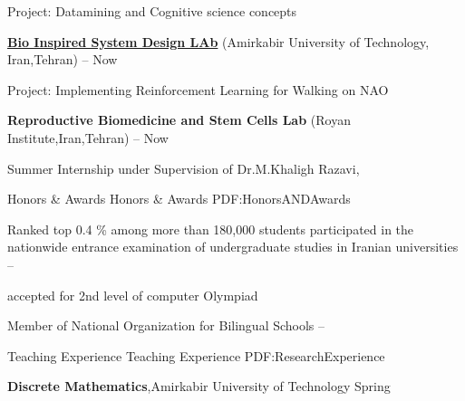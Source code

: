 \documentclass[letterpaper,MMMyyyy,nonstopmode]{simpleresumecv}
\begin{document}
\begin{Body}
\begin{Detail}
\SubBulletItem
Project: Datamining and Cognitive science concepts

\end{Detail}
\href{}
{\textbf{Bio Inspired System Design LAb}} 
\newline (Amirkabir University of Technology,
Iran,Tehran)
\hfill
{} --
Now

\begin{Detail}
\SubBulletItem
Project: Implementing Reinforcement Learning for Walking on NAO
\end{Detail}

{\textbf{Reproductive Biomedicine and Stem Cells Lab}} 
\newline (Royan Institute,Iran,Tehran)
\hfill
{} --
Now
\begin{Detail}
\SubBulletItem
Summer Internship under Supervision of Dr.M.Khaligh Razavi,
\end{Detail}






\Gap




\Section
{Honors \&\newline
Awards}
{Honors \& Awards}
{PDF:HonorsANDAwards}

\BulletItem
Ranked top 0.4 \% among more than 180,000 students participated
in the nationwide entrance examination of undergraduate studies
in Iranian universities  
\hfill
{} --

\BulletItem
 accepted for 2nd level of computer Olympiad 
\hfill
{}


\BulletItem
 Member of National Organization for Bilingual Schools
\hfill
{} --





\Section
{Teaching Experience}
{Teaching Experience}
{PDF:ResearchExperience}

\Entry
\textbf{Discrete Mathematics},Amirkabir University of Technology
\hfill
Spring 


\end{Body}
\end{document}
